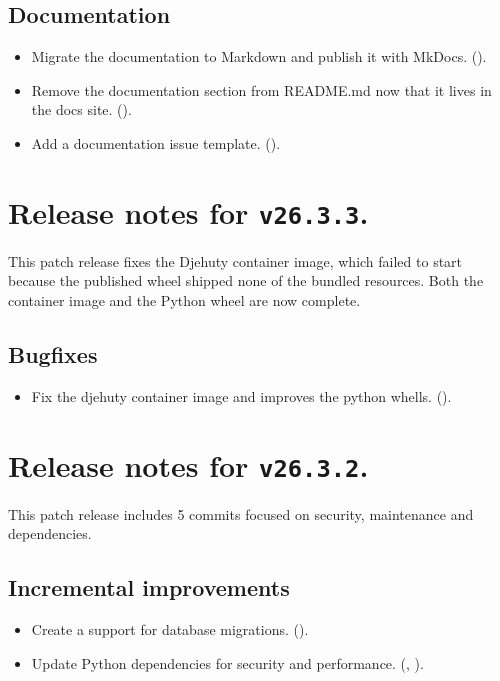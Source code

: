 \subsection*{Documentation}
\begin{itemize}
\item{Migrate the documentation to Markdown and publish it with MkDocs.
    ().}
\item{Remove the documentation section from README.md now that it lives in the docs site.
    ().}
\item{Add a documentation issue template.
    ().}
\end{itemize}

\section*{Release notes for \texttt{v26.3.3}.}

  This patch release fixes the Djehuty container image, which failed to start
because the published wheel shipped none of the bundled resources. Both the
container image and the Python wheel are now complete.

\subsection*{Bugfixes}
\begin{itemize}
\item{Fix the djehuty container image and improves the python whells.
    ().}
\end{itemize}

\section*{Release notes for \texttt{v26.3.2}.}

  This patch release includes 5 commits focused on security, maintenance and dependencies.

\subsection*{Incremental improvements}
\begin{itemize}
\item{Create a support for database migrations.
    ().}
\item{Update Python dependencies for security and performance.
    (,
    ).}
\end{itemize}

